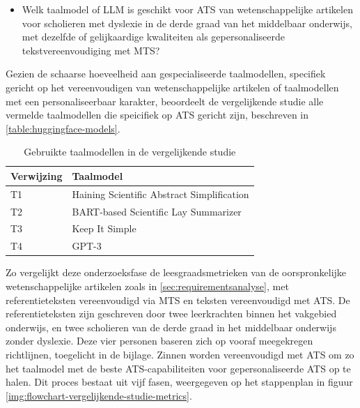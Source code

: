 \begin{itemize}
	\item Welk taalmodel of LLM is geschikt voor ATS van wetenschappelijke artikelen voor scholieren met dyslexie in de derde graad van het middelbaar onderwijs, met dezelfde of gelijkaardige kwaliteiten als gepersonaliseerde tekstvereenvoudiging met MTS?
\end{itemize}


Gezien de schaarse hoeveelheid aan gespecialiseerde taalmodellen, specifiek gericht op het vereenvoudigen van wetenschappelijke artikelen of taalmodellen met een personaliseerbaar karakter, beoordeelt de vergelijkende studie alle vermelde taalmodellen die speicifiek op ATS gericht zijn, beschreven in \ref{table:huggingface-models}. 

\begin{center}
	\begin{table}[H]
		\begin{tabular}{ | m{4cm} | m{12cm} | } 
			\hline
			\textbf{Verwijzing} & \textbf{Taalmodel} \\
			\hline
			T1 & Haining Scientific Abstract Simplification \\
			\hline
			T2 & BART-based Scientific Lay Summarizer \\
			\hline
			T3 & Keep It Simple\\
			\hline
			T4 & GPT-3 \\
			\hline
		\end{tabular}
		\caption{Gebruikte taalmodellen in de vergelijkende studie}
		\label{table:vergelijkende-studie-taalmodellen}
	\end{table}
\end{center}

\medspace

Zo vergelijkt deze onderzoeksfase de leesgraadsmetrieken van de oorspronkelijke wetenschappelijke artikelen zoals in \ref{sec:requirementsanalyse}, met referentieteksten vereenvoudigd via MTS en teksten vereenvoudigd met ATS. De referentieteksten zijn geschreven door twee leerkrachten binnen het vakgebied onderwijs, en twee scholieren van de derde graad in het middelbaar onderwijs zonder dyslexie. Deze vier personen baseren zich op vooraf meegekregen richtlijnen, toegelicht in de bijlage. Zinnen worden vereenvoudigd met ATS om zo het taalmodel met de beste ATS-capabiliteiten voor gepersonaliseerde ATS op te halen. Dit proces bestaat uit vijf fasen, weergegeven op het stappenplan in figuur \ref{img:flowchart-vergelijkende-studie-metrics}.

